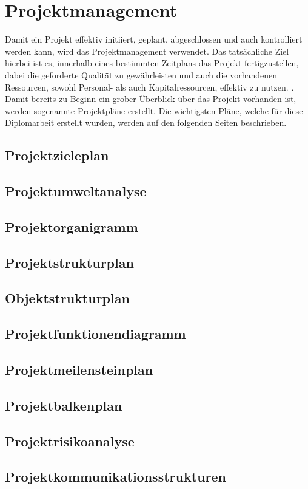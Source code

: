 \ifoot{\mangeng}
\chapter{Projektmanagement}
Damit ein Projekt effektiv initiiert, geplant, abgeschlossen und auch kontrolliert werden kann, wird das Projektmanagement verwendet. Das tatsächliche Ziel hierbei ist es, innerhalb eines bestimmten Zeitplans das Projekt fertigzustellen, dabei die geforderte Qualität zu gewährleisten und auch die vorhandenen Ressourcen, sowohl Personal- als auch Kapitalressourcen, effektiv zu nutzen. \cite[vgl.][]{refa:o.J.}.\\
Damit bereits zu Beginn ein grober Überblick über das Projekt vorhanden ist, werden sogenannte Projektpläne erstellt. Die wichtigsten Pläne, welche für diese Diplomarbeit erstellt wurden, werden auf den folgenden Seiten beschrieben.
\section{Projektzieleplan}


\newpage
\newpage
\section{Projektumweltanalyse}


\section{Projektorganigramm}


\section{Projektstrukturplan}


\section{Objektstrukturplan}


\section{Projektfunktionendiagramm}


\section{Projektmeilensteinplan}


\section{Projektbalkenplan}


\section{Projektrisikoanalyse}


\section{Projektkommunikationsstrukturen}


